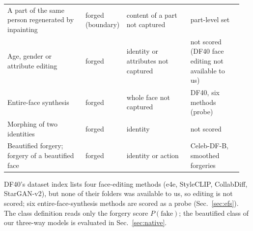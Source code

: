 \documentclass[10pt]{article}
\begin{document}
\begin{table}[H]
\begin{tabular}{@{}>{\raggedright\arraybackslash}p{0.33\linewidth}>{\raggedright\arraybackslash}p{0.13\linewidth}>{\raggedright\arraybackslash}p{0.27\linewidth}>{\raggedright\arraybackslash}p{0.22\linewidth}@{}}
A part of the same person regenerated by inpainting & forged (boundary) & content of a part not captured & part-level set \\
Age, gender or attribute editing & forged & identity or attributes not captured & not scored (DF40 face editing not available to us) \\
Entire-face synthesis & forged & whole face not captured & DF40, six methods (probe) \\
Morphing of two identities & forged & identity & not scored \\
Beautified forgery; forgery of a beautified face & forged & identity or action & Celeb-DF-B, smoothed forgeries \\
\bottomrule
\end{tabular}
\end{table}
DF40's dataset index lists four face-editing methods (e4e, StyleCLIP, CollabDiff, StarGAN-v2), but none of their folders was
available to us, so editing is not scored; six entire-face-synthesis methods are scored as a probe (Sec.~\ref{sec:efs}). The class definition reads only the
forgery score $P(\text{fake})$; the beautified class of our three-way models is evaluated in Sec.~\ref{sec:native}.
\end{document}
